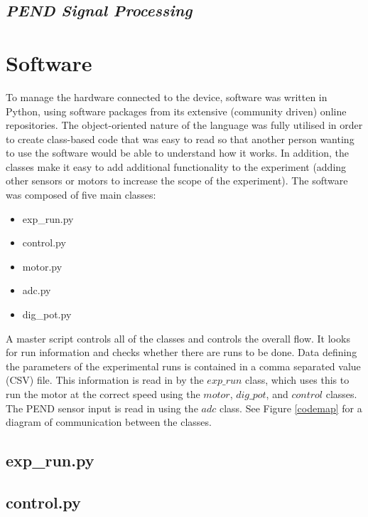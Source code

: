 \documentclass[a4]{report}
\begin{document}
	\subsection{\textit{PEND Signal Processing}}



	\section{Software}
	To manage the hardware connected to the device, software was written in Python, using software packages from its extensive (community driven) online repositories. The object-oriented nature of the language was fully utilised in order to create class-based code that was easy to read so that another person wanting to use the software would be able to understand how it works. In addition, the classes make it easy to add additional functionality to the experiment (adding other sensors or motors to increase the scope of the experiment). The software was composed of five main classes: 
	
	\begin{itemize}
	\item exp\_run.py
	\item control.py
	\item motor.py
	\item adc.py
	\item dig\_pot.py
	\end{itemize}

	A master script controls all of the classes and controls the overall flow. It looks for run information and checks whether there are runs to be done. Data defining the parameters of the experimental runs is contained in a comma separated value (CSV) file. This information is read in by the \(exp\_run\) class, which uses this to run the motor at the correct speed using the \(motor\), \(dig\_pot\), and \(control\) classes. The PEND sensor input is read in using the \(adc\) class. See Figure \ref{codemap} for a diagram of communication between the classes. \newline \newline \noindent
	
	\subsection{exp\_run.py}
	\subsection{control.py}
\end{document}
